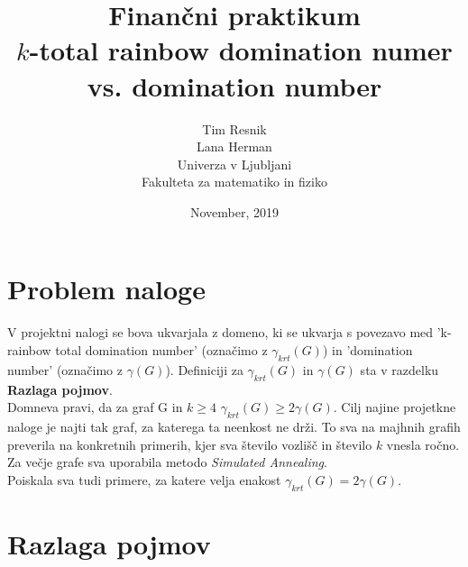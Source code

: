 \documentclass[a4paper]{article}
\title{Finančni praktikum \\\vspace{2cm} {\huge $k$-total rainbow domination numer vs. domination number}\vspace{2cm}}
\author{Tim Resnik \\[1.5mm] Lana Herman \\[1.5mm]\vspace{6cm}
Univerza v Ljubljani \\[1.5mm]
Fakulteta za matematiko in fiziko \vspace{2cm}}
\date{November, 2019}
\begin{document}
\begin{titlepage}
\clearpage \maketitle
\thispagestyle{empty}
\end{titlepage}

\section{Problem naloge}

V projektni nalogi se bova ukvarjala z domeno, ki se ukvarja s povezavo med 'k-rainbow total domination number' (označimo z $\gamma_{krt}(G)$)  in 'domination number' (označimo z $\gamma(G)$). Definiciji za $\gamma_{krt}(G)$ in $\gamma(G)$ sta v razdelku \textbf{Razlaga pojmov}.\\
Domneva pravi, da za graf G in $k \geq 4$  $\gamma_{krt}(G) \geq 2\gamma(G)$. Cilj najine projetkne naloge je najti tak graf, za katerega ta neenkost ne drži. To sva na majhnih grafih preverila na konkretnih primerih, kjer sva število vozlišč in število $k$ vnesla ročno. Za večje grafe sva uporabila metodo \textit{Simulated Annealing}.\\
Poiskala sva tudi primere, za katere velja enakost $\gamma_{krt}(G) = 2\gamma(G)$.

\section{Razlaga pojmov}
\end{document}
